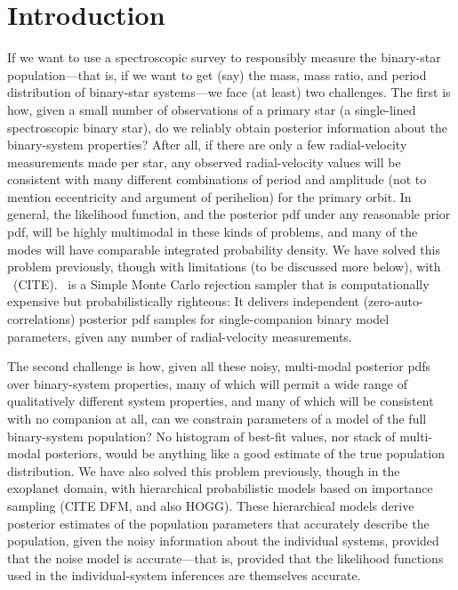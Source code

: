 \documentclass[modern, letterpaper]{aastex61}
\newcommand{\thejoker}{\project{The~Joker}}
\begin{document}

\section{Introduction} \label{sec:intro}

If we want to use a spectroscopic survey to responsibly measure the
binary-star population---that is, if we want to get (say) the mass,
mass ratio, and period distribution of binary-star systems---we face
(at least) two challenges.
The first is how, given a small number of observations of a primary
star (a single-lined spectroscopic binary star), do we reliably obtain posterior
information about the binary-system properties?
After all, if there are only a few radial-velocity measurements made
per star, any observed radial-velocity values will be consistent with
many different combinations of period and amplitude (not to mention
eccentricity and argument of perihelion) for the primary orbit.
In general, the likelihood function, and the posterior pdf under any
reasonable prior pdf, will be highly multimodal in these kinds of
problems, and many of the modes will have comparable integrated
probability density.
We have solved this problem previously, though with limitations (to be
discussed more below), with \thejoker\ (CITE).
\thejoker\ is a Simple Monte Carlo rejection sampler that is
computationally expensive but probabilistically righteous: It delivers
independent (zero-auto-correlations) posterior pdf samples for
single-companion binary model parameters, given any number of
radial-velocity measurements.

The second challenge is how, given all these noisy, multi-modal
posterior pdfs over binary-system properties, many of which will
permit a wide range of qualitatively different system properties, and
many of which will be consistent with no companion at all, can we
constrain parameters of a model of the full binary-system population?
No histogram of best-fit values, nor stack of multi-modal posteriors,
would be anything like a good estimate of the true population
distribution.
We have also solved this problem previously, though in the exoplanet
domain, with hierarchical probabilistic models based on importance
sampling (CITE DFM, and also HOGG).
These hierarchical models derive posterior estimates of the population
parameters that accurately describe the population, given the noisy
information about the individual systems, provided that the noise
model is accurate---that is, provided that the likelihood functions
used in the individual-system inferences are themselves accurate.
\end{document}
